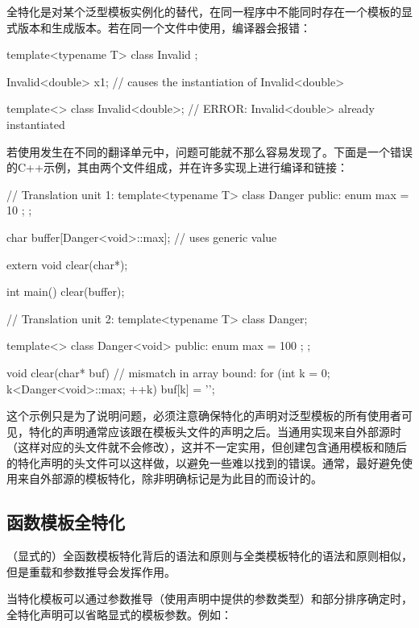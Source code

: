 全特化是对某个泛型模板实例化的替代，在同一程序中不能同时存在一个模板的显式版本和生成版本。若在同一个文件中使用，编译器会报错：

\begin{cpp}
template<typename T>
class Invalid {
};

Invalid<double> x1; // causes the instantiation of Invalid<double>

template<>
class Invalid<double>; // ERROR: Invalid<double> already instantiated
\end{cpp}

若使用发生在不同的翻译单元中，问题可能就不那么容易发现了。下面是一个错误的C++示例，其由两个文件组成，并在许多实现上进行编译和链接：

\begin{cpp}
// Translation unit 1:
template<typename T>
class Danger {
	public:
	enum { max = 10 };
};

char buffer[Danger<void>::max]; // uses generic value

extern void clear(char*);

int main()
{
	clear(buffer);
}

// Translation unit 2:
template<typename T>
class Danger;

template<>
class Danger<void> {
	public:
	enum { max = 100 };
};

void clear(char* buf)
{
	// mismatch in array bound:
	for (int k = 0; k<Danger<void>::max; ++k) {
		buf[k] = '\0';
	}
}
\end{cpp}

这个示例只是为了说明问题，必须注意确保特化的声明对泛型模板的所有使用者可见，特化的声明通常应该跟在模板头文件的声明之后。当通用实现来自外部源时（这样对应的头文件就不会修改），这并不一定实用，但创建包含通用模板和随后的特化声明的头文件可以这样做，以避免一些难以找到的错误。通常，最好避免使用来自外部源的模板特化，除非明确标记是为此目的而设计的。

\subsection{函数模板全特化}

（显式的）全函数模板特化背后的语法和原则与全类模板特化的语法和原则相似，但是重载和参数推导会发挥作用。

当特化模板可以通过参数推导（使用声明中提供的参数类型）和部分排序确定时，全特化声明可以省略显式的模板参数。例如：


